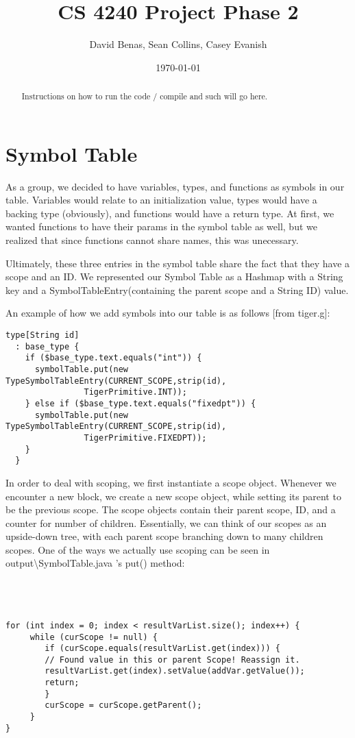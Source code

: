 \documentclass[a4paper]{article}
\title{CS 4240 Project Phase 2}
\author{David Benas, Sean Collins, Casey Evanish}
\date{\today}
\begin{document}
\maketitle

\begin{abstract}
Instructions on how to run the code / compile and such will go here.
\end{abstract}

\section{Symbol Table}
  As a group, we decided to have variables, types, and functions as symbols in our table. Variables would relate to an initialization value, types would have a backing type (obviously), and functions would have a return type. At first, we wanted functions to have their params in the symbol table as well, but we realized that since functions cannot share names, this was unecessary. 

Ultimately, these three entries in the symbol table share the fact that they have a scope and an ID. We represented our Symbol Table as a Hashmap with a String key and a SymbolTableEntry(containing the parent scope and a String ID) value.

An example of how we add symbols into our table is as follows [from tiger.g]:
\begin{verbatim}
type[String id] 
  : base_type {
    if ($base_type.text.equals("int")) { 
      symbolTable.put(new TypeSymbolTableEntry(CURRENT_SCOPE,strip(id), 
                TigerPrimitive.INT));
    } else if ($base_type.text.equals("fixedpt")) {
      symbolTable.put(new TypeSymbolTableEntry(CURRENT_SCOPE,strip(id), 
                TigerPrimitive.FIXEDPT));
    }
  }
\end{verbatim}

In order to deal with scoping, we first instantiate a scope object. Whenever we encounter a new block, we create a new scope object, while setting its parent to be the previous scope. The scope objects contain their parent scope, ID, and a counter for number of children. Essentially, we can think of our scopes as an upside-down tree, with each parent scope branching down to many children scopes. One of the ways we actually use scoping can be seen in output\textbackslash SymbolTable.java 's put() method: \\ \\ \\ \\
\begin{verbatim}
for (int index = 0; index < resultVarList.size(); index++) {
     while (curScope != null) {
        if (curScope.equals(resultVarList.get(index))) {
        // Found value in this or parent Scope! Reassign it.
        resultVarList.get(index).setValue(addVar.getValue());
        return;
        }           
        curScope = curScope.getParent();
     }          
}
\end{verbatim}
\end{document}
